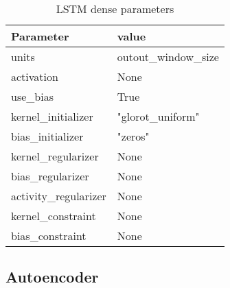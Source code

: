 \begin{table}[h]
  \centering
  \caption{LSTM dense parameters}
  \label{table:LSTM-dense-cell-parameters}
  \begin{tabular}{|l|l|}\hline
    Parameter             & value                \\ \hline
    \hline
    units                 & outout\_window\_size \\
    activation            & None                 \\
    use\_bias             & True                 \\
    kernel\_initializer   & "glorot\_uniform"    \\
    bias\_initializer     & "zeros"              \\
    kernel\_regularizer   & None                 \\
    bias\_regularizer     & None                 \\
    activity\_regularizer & None                 \\
    kernel\_constraint    & None                 \\
    bias\_constraint      & None                 \\
    \hline
  \end{tabular}
\end{table}





\subsection{Autoencoder}

